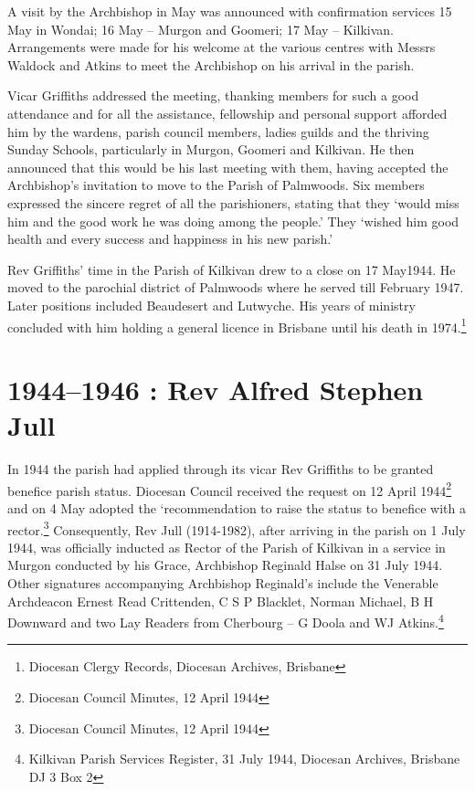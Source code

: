 A visit by the Archbishop in May was announced with confirmation
services 15 May in Wondai; 16 May -- Murgon and Goomeri; 17 May --
Kilkivan. Arrangements were made for his welcome at the various centres
with Messrs Waldock and Atkins to meet the Archbishop on his arrival in
the parish.

Vicar Griffiths addressed the meeting, thanking members for such a good
attendance and for all the assistance, fellowship and personal support
afforded him by the wardens, parish council members, ladies guilds and
the thriving Sunday Schools, particularly in Murgon, Goomeri and
Kilkivan. He then announced that this would be his last meeting with
them, having accepted the Archbishop's invitation to move to the Parish
of Palmwoods. Six members expressed the sincere regret of all the
parishioners, stating that they `would miss him and the good work he was
doing among the people.' They `wished him good health and every success
and happiness in his new parish.'

Rev Griffiths' time in the Parish of Kilkivan drew to a close on 17
May1944. He moved to the parochial district of Palmwoods where he served
till February 1947. Later positions included Beaudesert and Lutwyche.
His years of ministry concluded with him holding a general licence in
Brisbane until his death in 1974.\footnote{Diocesan Clergy Records,
  Diocesan Archives, Brisbane}

\printendnotes[custom]
\setcounter{endnote}{0}
\chapter{1944--1946 : Rev Alfred Stephen
Jull}

In 1944 the parish had applied through its vicar Rev Griffiths to be
granted benefice parish status. Diocesan Council received the request on
12 April 1944\footnote{Diocesan Council Minutes, 12 April 1944} and on 4
May adopted the `recommendation to raise the status to benefice with a
rector.\footnote{Diocesan Council Minutes, 12 April 1944} Consequently,
Rev Jull (1914-1982), after arriving in the parish on 1 July 1944, was
officially inducted as Rector of the Parish of Kilkivan in a service in
Murgon conducted by his Grace, Archbishop Reginald Halse on 31 July
1944. Other signatures accompanying Archbishop Reginald's include the
Venerable Archdeacon Ernest Read Crittenden, C S P Blacklet, Norman
Michael, B H Downward and two Lay Readers from Cherbourg -- G Doola and
WJ Atkins.\footnote{Kilkivan Parish Services Register, 31 July 1944,
  Diocesan Archives, Brisbane DJ 3 Box 2}


